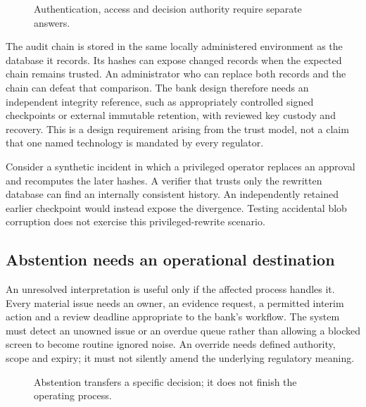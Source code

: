 \begin{figure}[H]
\centering
{}
\caption{Authentication, access and decision authority require separate answers.}
\label{fig:identity-access-authority}
\end{figure}

The audit chain is stored in the same locally administered environment as the
database it records. Its hashes can expose changed records when the expected
chain remains trusted. An administrator who can replace both records and the
chain can defeat that comparison. The bank design therefore needs an independent
integrity reference, such as appropriately controlled signed checkpoints or
external immutable retention, with reviewed key custody and recovery. This is
a design requirement arising from the trust model, not a claim that one named
technology is mandated by every regulator.

Consider a synthetic incident in which a privileged operator replaces an approval
and recomputes the later hashes. A verifier that trusts only the rewritten
database can find an internally consistent history. An independently retained
earlier checkpoint would instead expose the divergence. Testing accidental blob
corruption does not exercise this privileged-rewrite scenario.

\subsection{Abstention needs an operational destination}

An unresolved interpretation is useful only if the affected process handles it.
Every material issue needs an owner, an evidence request, a permitted interim
action and a review deadline appropriate to the bank's workflow. The system
must detect an unowned issue or an overdue queue rather than allowing a blocked
screen to become routine ignored noise. An override needs defined authority,
scope and expiry; it must not silently amend the underlying regulatory meaning.

\begin{figure}[H]
\centering
{}
\caption{Abstention transfers a specific decision; it does not finish the operating process.}
\label{fig:abstention-owner}
\end{figure}

